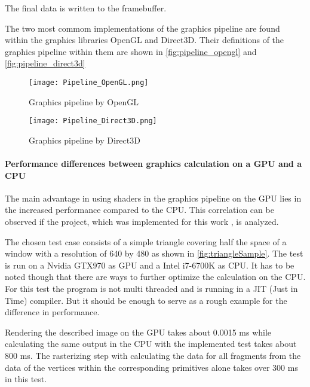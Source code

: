 The final data is written to the framebuffer.

The two most commom implementations of the graphics pipeline are found within the graphics libraries OpenGL and Direct3D. Their definitions of the graphics pipeline within them are shown in  \autoref{fig:pipeline_opengl} and \autoref{fig:pipeline_direct3d}

\nocite{Khronos_pipeline.2019}
\nocite{Microsoft_pipeline.2018}

\begin{figure}[h!]
  \centering 
  \texttt{[image: Pipeline\_OpenGL.png]}
  \caption[Graphics pipeline by OpenGL ]{Graphics pipeline by OpenGL}
  \label{fig:pipeline_opengl}
\end{figure}

\begin{figure}[h!]
  \centering 
  \texttt{[image: Pipeline\_Direct3D.png]}
  \caption[Graphics pipeline by Direct3D ]{Graphics pipeline by Direct3D}
  \label{fig:pipeline_direct3d}
\end{figure}

\newpage

\paragraph{Performance differences between graphics calculation on a GPU and a CPU}
\label{paragraph:performanceDif}

The main advantage in using shaders in the graphics pipeline on the GPU lies in the increased performance compared to the CPU.
This correlation can be observed if the project, which was implemented for this work , is analyzed.

The chosen test case consists of a simple triangle covering half the space of a window with a resolution of 640 by 480 as shown in \autoref{fig:triangleSample}. The test is run on a Nvidia GTX970 as GPU and a Intel i7-6700K as CPU. It has to be noted though that there are ways to further optimize the calculation on the CPU. For this test the program is not multi threaded and is running in a JIT (Just in Time) compiler. But it should be enough to serve as a rough example for the difference in performance.

Rendering the described image on the GPU takes about 0.0015 ms while calculating the same output in the CPU with the implemented test takes about 800 ms. The rasterizing step with calculating the data for all fragments from the data of the vertices within the corresponding primitives alone takes over 300 ms in this test.

